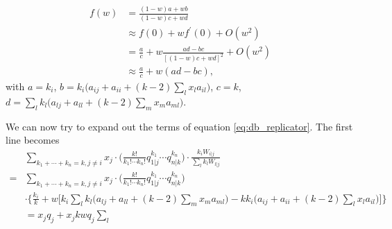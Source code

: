 \documentclass[14pt, justified]{tufte-handout}
\begin{document}
\begin{equation}
    \begin{split}
        f(w) & = \frac{(1 - w)a + wb}{(1 - w)c + wd}
        \\
        & \approx f(0) + w f^\prime(0) + O(w^2)
        \\
        & = \frac{a}{c} + w \frac{ad - bc}{[(1-w)c + wd]^2} + O(w^2)
        \\
        & \approx \frac{a}{c} + w(ad - bc),
    \end{split}
\end{equation}
with $a = k_i$, $b = k_i \Big( a_{ij} + a_{ii} + (k-2) \sum_l x_l a_{il} \Big) $, $c = k$, $d = \sum_l k_l \Big( a_{lj} + a_{ll} + (k-2) \sum_m x_m a_{ml} \Big)$.

We can now try to expand out the terms of equation \ref{eq:db_replicator}.
The first line becomes
\begin{equation}
    \begin{split}
        & \sum_{k_1 + \cdots + k_n = k, j \neq i } x_j \cdot \Big( \frac{k!}{k_1! \cdots k_n!} q_{1|j}^{k_1} \cdots q_{n|k}^{k_n} \Big) \cdot \frac{k_i W_{i|j}}{\sum_l k_l W_{l|j}}
        \\
        = & \sum_{k_1 + \cdots + k_n = k, j \neq i } x_j \cdot \Big( \frac{k!}{k_1! \cdots k_n!} q_{1|j}^{k_1}
        \cdots q_{n|k}^{k_n} \Big)
        \\
        & \cdot \Big\{ \frac{k_i}{k} + w \Big[ k_i \sum_l k_l \Big( a_{lj} + a_{ll} + (k-2) \sum_m x_m a_{ml} \Big) - k k_i \Big( a_{ij} + a_{ii} + (k-2) \sum_l x_l a_{il} \Big) \Big] \Big\}
        \\
        & = x_j q_j + x_j k w q_j \sum_l
    \end{split}
    \label{eq:db_sum_1}
\end{equation}
%
\end{document}
